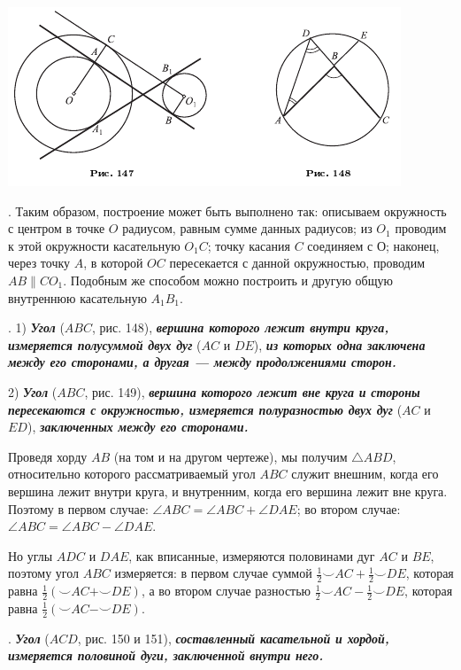 \documentclass[oneside]{book}
\begin{document}
\includegraphics{pics/ris-147-148}

.
Таким образом, построение может быть выполнено так:
описываем окружность с центром в точке $O$ радиусом, равным сумме данных радиусов;
из $O_1$ проводим к этой окружности касательную $O_1C$;
точку касания $C$ соединяем с О;
наконец, через точку $A$, в которой $OC$ пересекается с данной окружностью, проводим $AB \parallel CO_1$.
Подобным же способом можно построить и другую общую внутреннюю касательную $A_1B_1$.

.
1) \textbf{\emph{Угол}} ($ABC$, рис. 148), \textbf{\emph{вершина которого лежит внутри круга, измеряется полусуммой двух дуг}} ($AC$ и $DE$), \textbf{\emph{из которых одна заключена между его сторонами, а другая — между продолжениями сторон.}}

2) \textbf{\emph{Угол}} ($ABC$, рис. 149), \textbf{\emph{вершина которого лежит вне круга и стороны пересекаются с окружностью, измеряется полуразностью двух дуг}} ($AC$ и $ED$), \textbf{\emph{заключенных между его сторонами.}}

Проведя хорду $AB$ (на том и на другом чертеже), мы получим $\triangle ABD$, относительно которого рассматриваемый угол $ABC$ служит внешним, когда его вершина лежит внутри круга, и внутренним, когда его вершина лежит вне круга.
Поэтому в первом случае:
$\angle ABC = \angle ABC+\angle DAE$;
во втором случае:
$\angle ABC = \angle ABC-\angle DAE$.

Но углы $ADC$ и $DAE$, как вписанные, измеряются половинами дуг $AC$ и $BE$, поэтому угол $ABC$ измеряется:
в первом случае суммой
$\tfrac12{\smallsmile}AC+\tfrac12{\smallsmile}DE$, которая равна $\tfrac12({\smallsmile}AC+{\smallsmile}DE)$, а во втором случае разностью $\tfrac12{\smallsmile}AC-\tfrac12{\smallsmile}DE$, которая равна $\tfrac12({\smallsmile}AC-{\smallsmile}DE)$.

.
\textbf{\emph{Угол}} ($ACD$, рис. 150 и 151), \textbf{\emph{составленный касательной и хордой, измеряется половиной дуги, заключенной внутри него.}}
\end{document}
